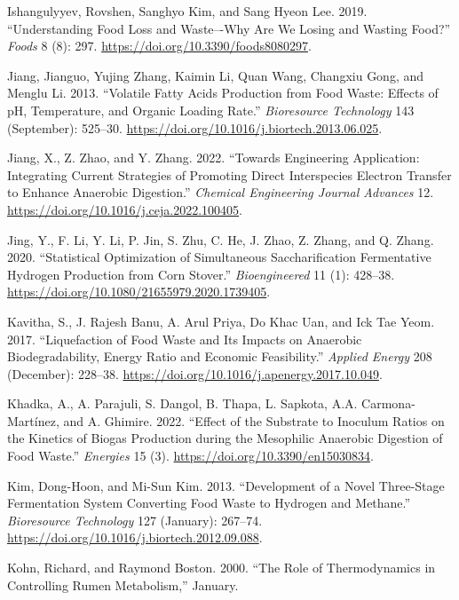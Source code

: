 \documentclass[11pt]{report}
\begin{document}
\begin{hangparas}{1.5em}{1}
\hypertarget{citeproc_bib_item_23}{Ishangulyyev, Rovshen, Sanghyo Kim, and Sang Hyeon Lee. 2019. “Understanding Food Loss and Waste–-Why Are We Losing and Wasting Food?” \textit{Foods} 8 (8): 297. \url{https://doi.org/10.3390/foods8080297}.}

\hypertarget{citeproc_bib_item_24}{Jiang, Jianguo, Yujing Zhang, Kaimin Li, Quan Wang, Changxiu Gong, and Menglu Li. 2013. “Volatile Fatty Acids Production from Food Waste: Effects of pH, Temperature, and Organic Loading Rate.” \textit{Bioresource Technology} 143 (September): 525–30. \url{https://doi.org/10.1016/j.biortech.2013.06.025}.}

\hypertarget{citeproc_bib_item_25}{Jiang, X., Z. Zhao, and Y. Zhang. 2022. “Towards Engineering Application: Integrating Current Strategies of Promoting Direct Interspecies Electron Transfer to Enhance Anaerobic Digestion.” \textit{Chemical Engineering Journal Advances} 12. \url{https://doi.org/10.1016/j.ceja.2022.100405}.}

\hypertarget{citeproc_bib_item_26}{Jing, Y., F. Li, Y. Li, P. Jin, S. Zhu, C. He, J. Zhao, Z. Zhang, and Q. Zhang. 2020. “Statistical Optimization of Simultaneous Saccharification Fermentative Hydrogen Production from Corn Stover.” \textit{Bioengineered} 11 (1): 428–38. \url{https://doi.org/10.1080/21655979.2020.1739405}.}

\hypertarget{citeproc_bib_item_27}{Kavitha, S., J. Rajesh Banu, A. Arul Priya, Do Khac Uan, and Ick Tae Yeom. 2017. “Liquefaction of Food Waste and Its Impacts on Anaerobic Biodegradability, Energy Ratio and Economic Feasibility.” \textit{Applied Energy} 208 (December): 228–38. \url{https://doi.org/10.1016/j.apenergy.2017.10.049}.}

\hypertarget{citeproc_bib_item_28}{Khadka, A., A. Parajuli, S. Dangol, B. Thapa, L. Sapkota, A.A. Carmona-Martínez, and A. Ghimire. 2022. “Effect of the Substrate to Inoculum Ratios on the Kinetics of Biogas Production during the Mesophilic Anaerobic Digestion of Food Waste.” \textit{Energies} 15 (3). \url{https://doi.org/10.3390/en15030834}.}

\hypertarget{citeproc_bib_item_29}{Kim, Dong-Hoon, and Mi-Sun Kim. 2013. “Development of a Novel Three-Stage Fermentation System Converting Food Waste to Hydrogen and Methane.” \textit{Bioresource Technology} 127 (January): 267–74. \url{https://doi.org/10.1016/j.biortech.2012.09.088}.}

\hypertarget{citeproc_bib_item_30}{Kohn, Richard, and Raymond Boston. 2000. “The Role of Thermodynamics in Controlling Rumen Metabolism,” January.}


\end{hangparas}
\end{document}
